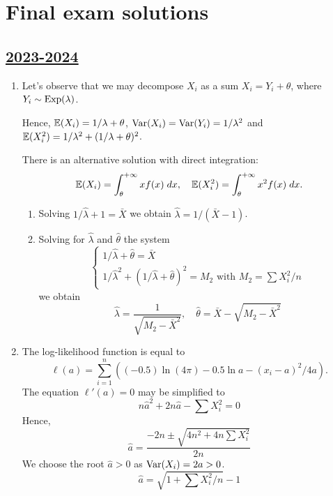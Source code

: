 
\newpage
\thispagestyle{empty}
\section{Final exam solutions}


\subsection[2023-2024]{\hyperref[sec:kr_04_2023_2024]{2023-2024}}
\label{sec:sol_kr_04_2023_2024} %



\begin{enumerate}

\item Let's observe that we may decompose $X_i$ as a sum $X_i = Y_i + \theta$,
where $Y_i \sim \mathrm{Exp}(\lambda)$. 

Hence, $\operatorname{\mathbb{E}}(X_i) = 1/\lambda + \theta$, $\operatorname{Var}(X_i) = \operatorname{Var}(Y_i) = 1/\lambda^2$
and $\operatorname{\mathbb{E}}(X_i^2) = 1/\lambda^2 + (1/\lambda + \theta)^2$.

There is an alternative solution with direct integration:
\[
\operatorname{\mathbb{E}}(X_i) = \int_{\theta}^{+\infty} x f(x) \; dx, \quad \operatorname{\mathbb{E}}(X_i^2) = \int_{\theta}^{+\infty} x^2 f(x) \; dx.
\]

\begin{enumerate}
    \item Solving $1/\hat\lambda + 1 = \bar X$ we obtain $\hat\lambda = 1/ (\bar X - 1)$.
    \item Solving for $\hat\lambda$ and $\hat\theta$ the system
\[
\begin{cases}
    1/\hat\lambda + \hat \theta = \bar X \\
    1/\hat\lambda^2 + (1/\hat\lambda + \hat\theta)^2 = M_2 \text{ with } M_2 = \sum X_i^2/n
\end{cases}    
\]
we obtain 
\[
\hat \lambda = \frac{1}{\sqrt{M_2 - \bar X^2}} , \quad \hat \theta =  \bar X - \sqrt{M_2 - \bar X^2}   
\]
\end{enumerate}

\item The log-likelihood function is equal to
\[
\ell(a) = \sum_{i=1}^n \left( (-0.5)\ln(4\pi) - 0.5 \ln a - (x_i - a)^2 / 4a \right).
\]
The equation $\ell'(a) = 0$ may be simplified to
\[
    n\hat a^2 + 2n\hat a - \sum X_i^2  = 0    
\]
Hence, 
\[
\hat a = \frac{-2n \pm \sqrt{4 n^2 + 4n \sum X_i^2}}{2n}
\]
We choose the root $\hat a > 0$ as $\operatorname{Var}(X_i) = 2a > 0$.
\[
\hat a = \sqrt{ 1  + \sum X_i^2/n} - 1
\]


\end{enumerate}
